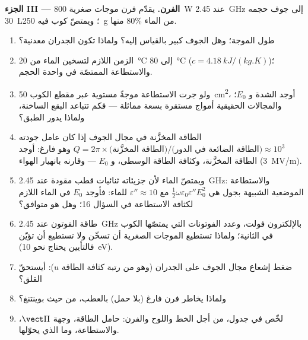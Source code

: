 \begin{problem}
\medskip
\noindent\textbf{الجزء III --- الفرن.}
يقدّم فرن موجات صغرية \qty{800}{W} عند \qty{2.45}{GHz} إلى جوف حجمه
\qty{30}{L}؛ ويمتصّ كوب فيه \qty{250}{g} من الماء $80\%$ منها.
\begin{enumerate}[resume]
  \item طول الموجة؛ وهل الجوف كبير بالقياس إليه؟ ولماذا تكون
        الجدران معدنية؟
  \item الزمن اللازم لتسخين الماء من \qty{20}{\degreeCelsius} إلى \qty{80}{\degreeCelsius}
        ($c = \qty{4.18}{kJ/(kg.K)}$)؛ والاستطاعة الممتصّة في واحدة الحجم.
  \item ولو جرت الاستطاعة موجةً مستوية عبر مقطع الكوب
        \qty{50}{cm^2}، أوجد الشدة و $E_0$؛ والمجالات الحقيقية
        أمواج مستقرة بسعة مماثلة --- فكم تتباعد البقع الساخنة،
        ولماذا يدور الطبق؟
  \item الطاقة المخزَّنة في مجال الجوف إذا كان عامل جودته
        $Q = 2\pi\times\text{(الطاقة المخزَّنة)}/\text{(الطاقة الضائعة في الدور)}
        \approx 10^3$ وهو فارغ: أوجد الطاقة المخزَّنة، وكثافة الطاقة الوسطى، و $E_0$
        --- وقارنه بانهيار الهواء (\qty{3}{MV/m}).
  \item ويمتصّ الماء لأن جزيئاته ثنائيات قطب مقودة عند
        \qty{2.45}{GHz}: والاستطاعة الموضعية الشبيهة بجول هي $\tfrac12\omega\varepsilon_0
        \varepsilon''E_0^2$ مع $\varepsilon'' \approx 10$ للماء: فأوجد $E_0$ في الماء
        اللازم لكثافة الاستطاعة في السؤال 16؛ وهل هو متوافق؟
  \item طاقة الفوتون عند \qty{2.45}{GHz} بالإلكترون فولت، وعدد الفوتونات
        التي يمتصّها الكوب في الثانية؛ ولماذا تستطيع الموجات الصغرية أن تسخّن ولا
        تستطيع أن تؤيّن (فالتأيين يحتاج نحو \qty{10}{eV}).
  \item ضغط إشعاع مجال الجوف على الجدران (وهو من رتبة
        كثافة الطاقة $u$): أيستحقّ القلق؟
  \item ولماذا يخاطر فرن فارغ (بلا حمل) بالعطب، من حيث
        بوينتنغ؟
  \item لخّص في جدول، من أجل الخط واللوح والفرن: حامل
        الطاقة، وجهة $\vect\Pi$، والاستطاعة، وما الذي
        يحوّلها.
\end{enumerate}
\end{problem}
